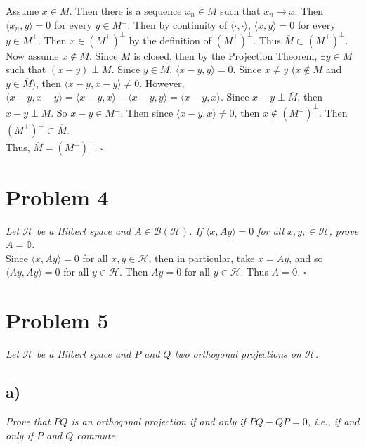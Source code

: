 \documentclass[12pt]{article}
\theoremstyle{plain}
\begin{document}
Assume $x \in \overline{M}$.  Then there is a sequence $x_n \in M$ such that $x_n \rightarrow x$.  Then $\langle x_n, y \rangle = 0$ for every $y \in M^\perp$.  Then by continuity of $\langle\cdot,\cdot\rangle$, $\langle x, y\rangle = 0$ for every $y \in M^\perp$.  Then $x \in (M^\perp)^\perp$ by the definition of $(M^\perp)^\perp$.  Thus $\overline{M} \subset (M^\perp)^\perp$. \\

Now assume $x \not\in \overline{M}$.  Since $\overline{M}$ is closed, then by the Projection Theorem, $\exists y \in \overline{M}$ such that $(x - y) \perp \overline{M}$.  Since $y \in \overline{M}$, $\langle x - y, y\rangle = 0$.  Since $x \neq y$ ($x \not\in \overline{M}$ and $y \in \overline{M}$), then $\langle x - y, x - y \rangle \neq 0$.  However, $\langle x - y, x - y \rangle = \langle x - y, x \rangle - \langle x - y, y \rangle = \langle x - y, x \rangle$.  Since $x - y \perp \overline{M}$, then $x - y \perp M$.  So $x - y \in M^\perp$.  Then since $\langle x - y, x \rangle \neq 0$, then $x \not\in (M^\perp)^\perp$.  Then $(M^\perp)^\perp \subset \overline{M}$. \\

Thus, $\overline{M} = (M^\perp)^\perp$. \hfill $\square$

\section*{Problem 4}
\emph{Let $\mathcal{H}$ be a Hilbert space and $A \in \mathcal{B}(\mathcal{H})$.  If $\langle x, Ay\rangle = 0$ for all $x, y, \in \mathcal{H}$, prove $A = \mathbb{0}$.} \\

Since $\langle x, Ay \rangle = 0$ for all $x,y \in \mathcal{H}$, then in particular, take $x = Ay$, and so $\langle Ay, Ay \rangle = 0$ for all $y \in \mathcal{H}$.  Then $Ay = 0$ for all $y \in \mathcal{H}$.  Thus $A = \mathbb{0}$. \hfill $\square$

\section*{Problem 5}
\emph{Let $\mathcal{H}$ be a Hilbert space and $P$ and $Q$ two orthogonal projections on $\mathcal{H}$.}

\subsection*{ a)}
\emph{Prove that $PQ$ is an orthogonal projection if and only if $PQ - QP = 0$, i.e., if and only if $P$ and $Q$ commute.} \\
\end{document}
